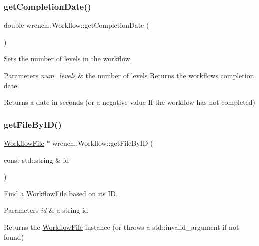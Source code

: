 \subsubsection{\texorpdfstring{get\+Completion\+Date()}{getCompletionDate()}}
{\footnotesize\ttfamily double wrench\+::\+Workflow\+::get\+Completion\+Date (\begin{DoxyParamCaption}{ }\end{DoxyParamCaption})}



Sets the number of levels in the workflow. 


\begin{DoxyParams}{Parameters}
{\em num\+\_\+levels} & the number of levels Returns the workflow\textquotesingle{}s completion date \\
\hline
\end{DoxyParams}
\begin{DoxyReturn}{Returns}
a date in seconds (or a negative value If the workflow has not completed) 
\end{DoxyReturn}
\mbox{\label{classwrench_1_1_workflow_a19b3b6f36f684f8c367f42a818b0a0c2}} 
\subsubsection{\texorpdfstring{get\+File\+By\+I\+D()}{getFileByID()}}
{\footnotesize\ttfamily \hyperlink{classwrench_1_1_workflow_file}{Workflow\+File} $\ast$ wrench\+::\+Workflow\+::get\+File\+By\+ID (\begin{DoxyParamCaption}\item[{const std\+::string \&}]{id }\end{DoxyParamCaption})}



Find a \hyperlink{classwrench_1_1_workflow_file}{Workflow\+File} based on its ID. 


\begin{DoxyParams}{Parameters}
{\em id} & a string id\\
\hline
\end{DoxyParams}
\begin{DoxyReturn}{Returns}
the \hyperlink{classwrench_1_1_workflow_file}{Workflow\+File} instance (or throws a std\+::invalid\+\_\+argument if not found)
\end{DoxyReturn}

